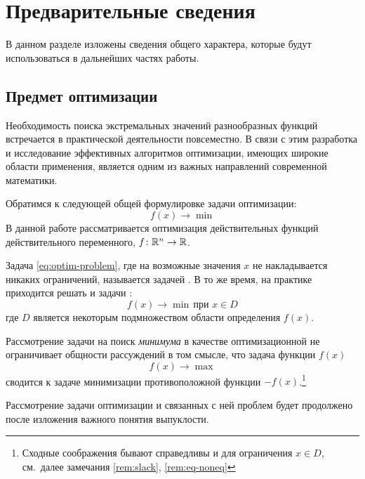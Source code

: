 \section{Предварительные сведения}
В данном разделе изложены сведения общего характера, которые будут
использоваться в дальнейших частях работы.

\subsection{Предмет оптимизации}

Необходимость поиска экстремальных значений разнообразных функций
встречается в практической деятельности повсеместно. В связи с этим
разработка и исследование эффективных алгоритмов оптимизации, имеющих
широкие области применения, является одним из важных направлений
современной математики.

Обратимся к следующей общей формулировке задачи оптимизации:
\begin{equation}
  \label{eq:optim-problem}
  f(x) \to \min
\end{equation}
В данной работе рассматривается оптимизация действительных функций
действительного переменного, $f\colon \mathbb{R}^n \to \mathbb{R}$.

Задача \eqref{eq:optim-problem}, где на возможные значения $x$ не
накладывается никаких ограничений, называется задачей
. В то же время, на практике
приходится решать и задачи :
\begin{equation}
  \label{eq:optim-problem-c}
  f(x) \to \min\, \text{при } x \in D
\end{equation}
где $D$ является некоторым подмножеством области определения $f(x)$.

\begin{rem}
  Рассмотрение задачи на поиск \emph{минимума} в качестве
  оптимизационной не ограничивает общности рассуждений в том смысле,
  что задача  функции $f(x)$
  \begin{equation*}
    f(x) \to \max
  \end{equation*}
  сводится к задаче минимизации противоположной функции
  $-f(x)$.\footnote[1]{Сходные соображения бывают справедливы и для
    ограничения \mbox{$x \in D$}, см. далее замечания \ref{rem:slack},
    \ref{rem:eq-noneq}}
\end{rem}

Рассмотрение задачи оптимизации и связанных с ней проблем будет
продолжено после изложения важного понятия выпуклости.



